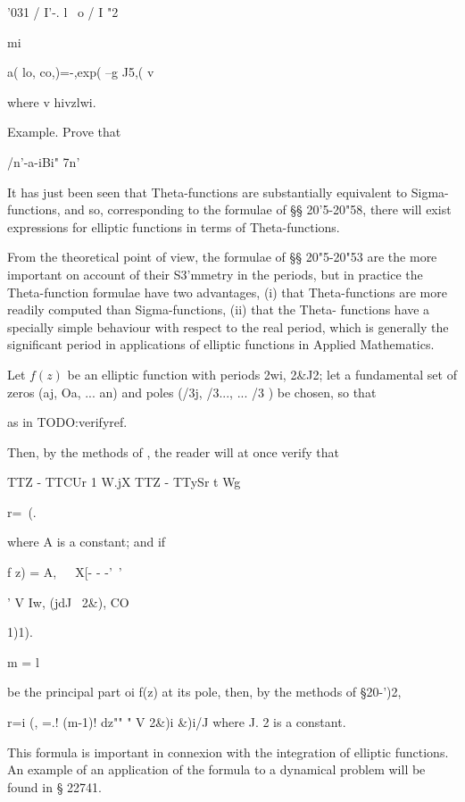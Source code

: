 '031 / I'-. l \ o / I "2

mi

a( lo, co,)=-,exp( --g J5,( v

where v hivzlwi.

Example. Prove that

/n'-a-iBi" 7n'\


It has just been seen that Theta-functions are substantially
equivalent to Sigma-functions, and so, corresponding to the formulae
of §§ 20'5-20"58, there will exist expressions for elliptic functions
in terms of Theta-functions.

%
%

From the theoretical point of view, the formulae of §§ 20"5-20"53 are
the more important on account of their S3'mmetry in the periods, but
in practice the Theta-function formulae have two advantages, (i) that
Theta-functions are more readily computed than Sigma-functions, (ii)
that the Theta- functions have a specially simple behaviour with
respect to the real period, which is generally the significant period
in applications of elliptic functions in Applied Mathematics.

Let $f(z)$ be an elliptic function with periods 2wi, 2\&J2; let a
fundamental set of zeros (aj, Oa, ... an) and poles (/3j, /3..., ...
/3 ) be chosen, so that

as in TODO:verifyref.

Then, by the methods of , the reader will at once verify that

TTZ - TTCUr 1 W.jX TTZ - TTySr t Wg

r=\ (.

where A is a constant; and if

f z) = A,\ \ \ X[- - -'~' \ \ %

' V Iw, (jdJ \ 2\&), CO

1)1).

m = l

be the principal part oi f(z) at its pole, then, by the methods of
§20-')2,

r=i (, =.! (m-1)! dz"" " V 2\&)i \&)i/J where J. 2 is a constant.

This formula is important in connexion with the integration of
elliptic functions. An example of an application of the formula to a
dynamical problem will be found in § 22741.

